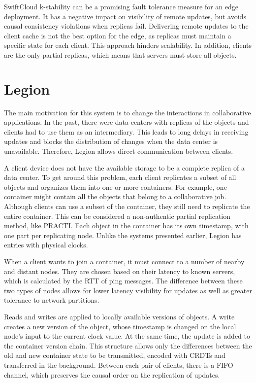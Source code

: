 SwiftCloud k-stability can be a promising fault tolerance measure for an edge deployment. It has a negative impact on visibility of remote updates, but avoids causal consistency violations when replicas fail. Delivering remote updates to the client cache is not the best option for the edge, as replicas must maintain a specific state for each client. This approach hinders scalability. In addition, clients are the only partial replicas, which means that servers must store all objects.

\section{Legion}
\label{sec:soa:legion}

The main motivation for this system \cite{van2017legion} is to change the interactions in collaborative applications. In the past, there were data centers with replicas of the objects and clients had to use them as an intermediary. This leads to long delays in receiving updates and blocks the distribution of changes when the data center is unavailable. Therefore, Legion allows direct communication between clients. 

A client device does not have the available storage to be a complete replica of a data center. To get around this problem, each client replicates a subset of all objects and organizes them into one or more containers. For example, one container might contain all the objects that belong to a collaborative job. Although clients can use a subset of the container, they still need to replicate the entire container. This can be considered a non-authentic partial replication method, like PRACTI. Each object in the container has its own timestamp, with one part per replicating node. Unlike the systems presented earlier, Legion has entries with physical clocks. 

When a client wants to join a container, it must connect to a number of nearby and distant nodes. They are chosen based on their latency to known servers, which is calculated by the RTT of ping messages. The difference between these two types of nodes allows for lower latency visibility for updates as well as greater tolerance to network partitions. 

Reads and writes are applied to locally available versions of objects. A write creates a new version of the object, whose timestamp is changed on the local node's input to the current clock value. At the same time, the update is added to the container version chain. This structure allows only the differences between the old and new container state to be transmitted, encoded with CRDTs and transferred in the background. Between each pair of clients, there is a FIFO channel, which preserves the causal order on the replication of updates. 

